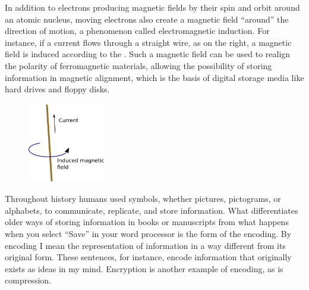 

In addition to electrons producing magnetic fields by their spin and orbit around an atomic nucleus, moving electrons also create a magnetic field ``around'' the direction of motion, a phenomenon called electromagnetic induction. For instance, if a current flows through a straight wire, as on the right, a magnetic field is induced according to the . Such a magnetic field can be used to realign the polarity of ferromagnetic materials, allowing the possibility of storing information in magnetic alignment, which is the basis of digital storage media like hard drives and floppy disks.


	\begin{figure}[H]
	   \centering
	   \includegraphics[width=0.3\textwidth]{../sections/seasons/season1/111/images/111(1).png} 
	\end{figure}




Throughout history humans used symbols, whether pictures, pictograms, or alphabets, to communicate, replicate, and store information. What differentiates older ways of storing information in books or manuscripts from what happens when you select ``Save'' in your word processor is the form of the encoding. By encoding I mean the representation of information in a way different from its original form. These sentences, for instance, encode information that originally exists as ideas in my mind. Encryption is another example of encoding, as is compression.


